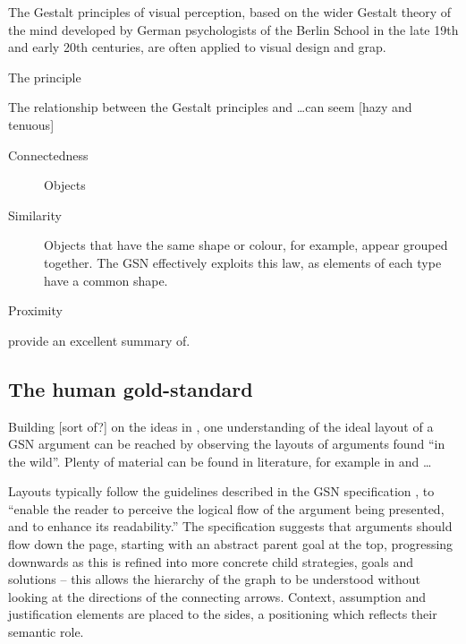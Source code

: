 The Gestalt principles of visual perception,
based on the wider Gestalt theory of the mind developed by German psychologists of the Berlin School in the late 19th and early 20th centuries,
are often applied to visual design and grap.

The principle 

The relationship between the Gestalt principles and \ldots can seem [hazy and tenuous]

\begin{description}
    \item[Connectedness] Objects 

    \item[Similarity] Objects that have the same shape or colour, for example, appear grouped together.
    The GSN effectively exploits this law, as elements of each type have a common shape.
    
    \item[Proximity]
    
\end{description}


\citeauthor{kennysun} provide an excellent summary of. 


\subsection{The human gold-standard }

Building [sort of?] on the ideas in \cite{5674033}, one understanding of the ideal layout of a GSN argument can be reached by observing the layouts of arguments found ``in the wild''.
Plenty of material can be found in literature, for example in \cite{Habli:2006:PPC:1183088.1183090} and  \cite{insilico} \ldots

Layouts typically follow the guidelines described in the GSN specification \citep[section~2.2, pp.~26--27]{gsnstandard}, 
to ``enable the reader to perceive the logical flow of the argument being presented, and to enhance its readability.''
The specification suggests that arguments should flow down the page, starting with an abstract parent goal at the top, progressing downwards as this is refined into more concrete child strategies, goals and solutions -- this allows the hierarchy of the graph to be understood without looking at the directions of the connecting arrows.
Context, assumption and justification elements are placed to the sides, a positioning which reflects their semantic role.

